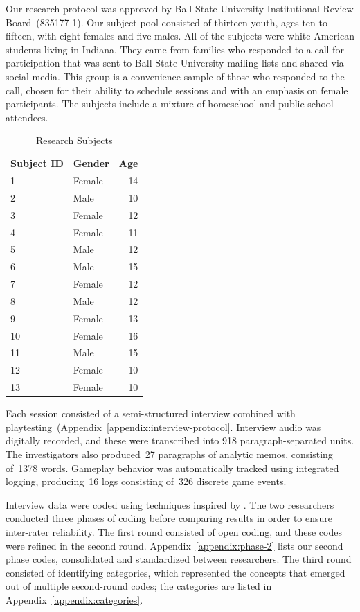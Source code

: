 \documentclass[letterpaper]{article}
\begin{document}
Our research protocol was approved by Ball State University
Institutional Review Board~(835177-1). 
Our subject pool consisted of thirteen youth, ages ten to fifteen,
with eight females and five males. All of the subjects were
white American students living in Indiana. 
They came from families who responded to a call for participation that
was sent to Ball State University mailing lists and shared via social
media. This group is a convenience sample of those who responded to the
call, chosen for their ability to schedule sessions and with an emphasis
on female participants. The subjects include a mixture of homeschool
and public school attendees.

\begin{table}
\begin{framed}
\centering
\begin{tabular}{llr}
\textbf{Subject ID} & \textbf{Gender} & \textbf{Age}\\
1 & Female & 14\\
2 & Male & 10\\
3 & Female & 12\\
4 & Female & 11\\
5 & Male & 12\\
6 & Male & 15\\
7 & Female & 12\\
8 & Male & 12\\
9 & Female & 13\\
10 & Female & 16\\
11 & Male & 15\\
12 & Female & 10\\
13 & Female & 10\\
\end{tabular}
\caption{Research Subjects}
\end{framed}
\end{table}

Each session consisted of a semi-structured interview combined with
playtesting~(Appendix~\ref{appendix:interview-protocol}.
Interview audio was digitally recorded, and these were transcribed
into 918 paragraph-separated units. 
The investigators also 
produced~27 paragraphs of analytic memos,
consisting of~1378 words.
Gameplay behavior was automatically tracked using integrated logging, 
producing~16 logs consisting of~326 discrete game events.

Interview data were coded using techniques inspired by
\citet{Saldana2009}. The two researchers conducted three phases 
of coding before comparing results in order to ensure inter-rater
reliability. The first round consisted of open coding, and these
codes were refined in the second round. 
Appendix~\ref{appendix:phase-2} lists our second phase codes,
consolidated and standardized between researchers.
The third round consisted of
identifying categories, which represented the concepts that emerged
out of multiple second-round codes; the categories are listed in
Appendix~\ref{appendix:categories}.
\end{document}
